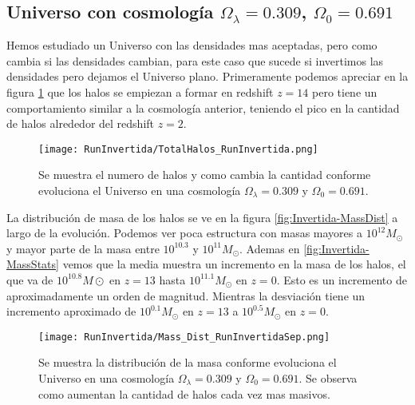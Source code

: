 \subsection{Universo con cosmología  \texorpdfstring{$\Omega_\lambda = 0.309$, $\Omega_0 = 0.691$ }{Omega lambda = 0.309, Omega 0 = 0.691} }
Hemos estudiado un Universo con las densidades mas aceptadas, pero como cambia si las densidades cambian, para este caso que sucede si invertimos las densidades pero dejamos el Universo plano. Primeramente podemos apreciar en la figura \ref{fig:Invertida-TotalHalos} que los halos se empiezan a formar en redshift $z=14$ pero tiene un comportamiento similar a la cosmología anterior, teniendo el pico en la cantidad de halos alrededor del redshift $z=2$. 

\begin{figure}[H]
    \centering
    \texttt{[image: RunInvertida/TotalHalos\_RunInvertida.png]}
    \caption[Evolución del número de halos en un Universo $\Omega_\lambda = 0.309 $, $\Omega_0 = 0.691$]{\footnotesize Se muestra el numero de halos y como cambia la cantidad conforme evoluciona el Universo en una cosmología $\Omega_\lambda = 0.309 $ y $\Omega_0 = 0.691$.}    
    \label{fig:Invertida-TotalHalos}
\end{figure}

La distribución de masa de los halos se ve en la figura \ref{fig:Invertida-MassDist} a largo de la evolución. Podemos ver poca estructura con masas mayores a $10^{12}M_\odot$ y mayor parte de la masa entre $10^{10.3}$ y $10^{11}M_\odot$. Ademas en  \ref{fig:Invertida-MassStats} vemos que la media muestra un incremento en la masa de los halos, el que va de $10^{10.8} M\odot$ en $z=13$ hasta $10^{11.1}M_\odot$ en $z=0$. Esto es un incremento de aproximadamente un orden de magnitud. Mientras la desviación tiene un incremento aproximado de $10^{0.1}M_\odot$ en $z=13$ a $10^{0.5}M_\odot$ en $z=0$. 

\begin{figure}[H]
    \centering
    \texttt{[image: RunInvertida/Mass\_Dist\_RunInvertidaSep.png]}
    \caption[Distribución de masa]{\footnotesize Se muestra la distribución de la masa conforme evoluciona el Universo en una cosmología $\Omega_\lambda = 0.309 $ y $\Omega_0 = 0.691$. Se observa como aumentan la cantidad de halos cada vez mas masivos.}
    \label{fig:Invertida-MassDistSep}
\end{figure}

